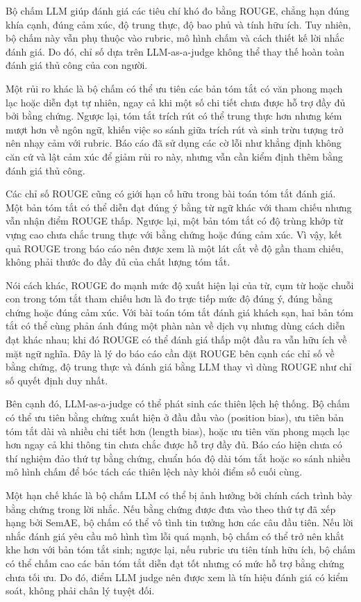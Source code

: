 Bộ chấm LLM giúp đánh giá các tiêu chí khó đo bằng ROUGE, chẳng hạn đúng khía cạnh, đúng cảm xúc, độ trung thực, độ bao phủ và tính hữu ích. Tuy nhiên, bộ chấm này vẫn phụ thuộc vào rubric, mô hình chấm và cách thiết kế lời nhắc đánh giá. Do đó, chỉ số dựa trên LLM-as-a-judge không thể thay thế hoàn toàn đánh giá thủ công của con người.

Một rủi ro khác là bộ chấm có thể ưu tiên các bản tóm tắt có văn phong mạch lạc hoặc diễn đạt tự nhiên, ngay cả khi một số chi tiết chưa được hỗ trợ đầy đủ bởi bằng chứng. Ngược lại, tóm tắt trích rút có thể trung thực hơn nhưng kém mượt hơn về ngôn ngữ, khiến việc so sánh giữa trích rút và sinh trừu tượng trở nên nhạy cảm với rubric. Báo cáo đã sử dụng các cờ lỗi như khẳng định không căn cứ và lật cảm xúc để giảm rủi ro này, nhưng vẫn cần kiểm định thêm bằng đánh giá thủ công.

Các chỉ số ROUGE cũng có giới hạn cố hữu trong bài toán tóm tắt đánh giá. Một bản tóm tắt có thể diễn đạt đúng ý bằng từ ngữ khác với tham chiếu nhưng vẫn nhận điểm ROUGE thấp. Ngược lại, một bản tóm tắt có độ trùng khớp từ vựng cao chưa chắc trung thực với bằng chứng hoặc đúng cảm xúc. Vì vậy, kết quả ROUGE trong báo cáo nên được xem là một lát cắt về độ gần tham chiếu, không phải thước đo đầy đủ của chất lượng tóm tắt.

Nói cách khác, ROUGE đo mạnh mức độ xuất hiện lại của từ, cụm từ hoặc chuỗi con trong tóm tắt tham chiếu hơn là đo trực tiếp mức độ đúng ý, đúng bằng chứng hoặc đúng cảm xúc. Với bài toán tóm tắt đánh giá khách sạn, hai bản tóm tắt có thể cùng phản ánh đúng một phàn nàn về dịch vụ nhưng dùng cách diễn đạt khác nhau; khi đó ROUGE có thể đánh giá thấp một đầu ra vẫn hữu ích về mặt ngữ nghĩa. Đây là lý do báo cáo cần đặt ROUGE bên cạnh các chỉ số về bằng chứng, độ trung thực và đánh giá bằng LLM thay vì dùng ROUGE như chỉ số quyết định duy nhất.

Bên cạnh đó, LLM-as-a-judge có thể phát sinh các thiên lệch hệ thống. Bộ chấm có thể ưu tiên bằng chứng xuất hiện ở đầu đầu vào (position bias), ưu tiên bản tóm tắt dài và nhiều chi tiết hơn (length bias), hoặc ưu tiên văn phong mạch lạc hơn ngay cả khi thông tin chưa chắc được hỗ trợ đầy đủ. Báo cáo hiện chưa có thí nghiệm đảo thứ tự bằng chứng, chuẩn hóa độ dài tóm tắt hoặc so sánh nhiều mô hình chấm để bóc tách các thiên lệch này khỏi điểm số cuối cùng.

Một hạn chế khác là bộ chấm LLM có thể bị ảnh hưởng bởi chính cách trình bày bằng chứng trong lời nhắc. Nếu bằng chứng được đưa vào theo thứ tự đã xếp hạng bởi SemAE, bộ chấm có thể vô tình tin tưởng hơn các câu đầu tiên. Nếu lời nhắc đánh giá yêu cầu mô hình tìm lỗi quá mạnh, bộ chấm có thể trở nên khắt khe hơn với bản tóm tắt sinh; ngược lại, nếu rubric ưu tiên tính hữu ích, bộ chấm có thể chấm cao các bản tóm tắt diễn đạt tốt nhưng có mức hỗ trợ bằng chứng chưa tối ưu. Do đó, điểm LLM judge nên được xem là tín hiệu đánh giá có kiểm soát, không phải chân lý tuyệt đối.

